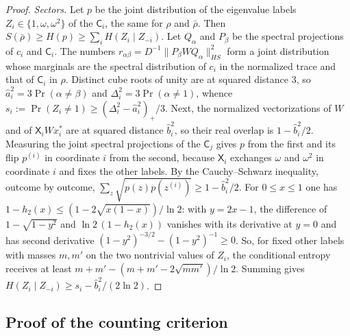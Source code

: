\begin{proof}
\emph{Sectors.} Let $p$ be the joint distribution of the eigenvalue labels $Z_i\in\{1,\omega,\omega^2\}$ of the $\mathsf C_i$, the same for $\rho$
and $\bar\rho$. Then $S(\bar\rho)\ge H(p)\ge\sum_iH(Z_i\mid Z_{-i})$. Let $Q_\alpha$ and $P_\beta$ be the spectral projections of $c_i$ and
$\mathsf C_i$. The numbers $r_{\alpha\beta}=D^{-1}\|P_\beta WQ_\alpha\|_{HS}^2$ form a joint distribution whose marginals are the spectral distribution
of $c_i$ in the normalized trace and that of $\mathsf C_i$ in $\rho$. Distinct cube roots of unity are at squared distance $3$, so
$\hat a_i^2=3\Pr(\alpha\ne\beta)$ and $\Delta_i^2=3\Pr(\alpha\ne1)$, whence $s_i:=\Pr(Z_i\ne1)\ge(\Delta_i^2-\hat a_i^2)_+/3$. Next, the normalized
vectorizations of $W$ and of $\mathsf X_iWx_i^*$ are at squared distance $\hat b_i^2$, so their real overlap is $1-\hat b_i^2/2$. Measuring the joint
spectral projections of the $\mathsf C_j$ gives $p$ from the first and its flip $p^{(i)}$ in coordinate $i$ from the second, because $\mathsf X_i$
exchanges $\omega$ and $\omega^2$ in coordinate $i$ and fixes the other labels. By the Cauchy--Schwarz inequality, outcome by outcome,
$\sum_z\sqrt{p(z)p(z^{(i)})}\ge1-\hat b_i^2/2$. For $0\le x\le1$ one has $1-h_2(x)\le(1-2\sqrt{x(1-x)})/\ln2$: with $y=2x-1$, the difference of
$1-\sqrt{1-y^2}$ and $\ln2\,(1-h_2(x))$ vanishes with its derivative at $y=0$ and has second derivative $(1-y^2)^{-3/2}-(1-y^2)^{-1}\ge0$. So,
for fixed other labels with masses $m,m'$ on the two nontrivial values of $Z_i$, the conditional entropy receives at least
$m+m'-(m+m'-2\sqrt{mm'})/\ln2$. Summing gives $H(Z_i\mid Z_{-i})\ge s_i-\hat b_i^2/(2\ln2)$.
\end{proof}

\subsection{Proof of the counting criterion}

